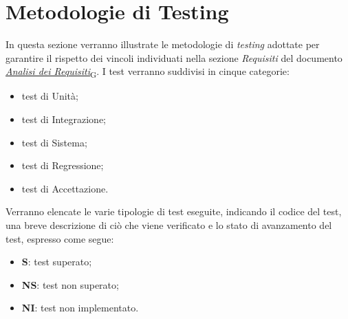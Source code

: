 \section{Metodologie di Testing}
In questa sezione verranno illustrate le metodologie di \textit{testing} adottate per garantire il rispetto dei vincoli individuati
nella sezione \textit{Requisiti} del documento \href{https://7last.github.io/docs/rtb/documentazione-esterna/analisi-dei-requisiti}{\href{https://7last.github.io/docs/rtb/documentazione-interna/glossario\#analisi-dei-requisiti}{\textit{Analisi dei Requisiti}\textsubscript{G}}}.
I test verranno suddivisi in cinque categorie:
\begin{itemize}
    \item test di Unità;
    \item test di Integrazione;
    \item test di Sistema;
    \item test di Regressione;
    \item test di Accettazione.
\end{itemize}

Verranno elencate le varie tipologie di test eseguite, indicando il codice del test, una breve descrizione di ciò che viene verificato e lo stato di avanzamento del test, espresso come segue:
\begin{itemize}
	\item \textbf{S}: test superato;
	\item \textbf{NS}: test non superato;
	\item \textbf{NI}: test non implementato.
\end{itemize}

\newpage
